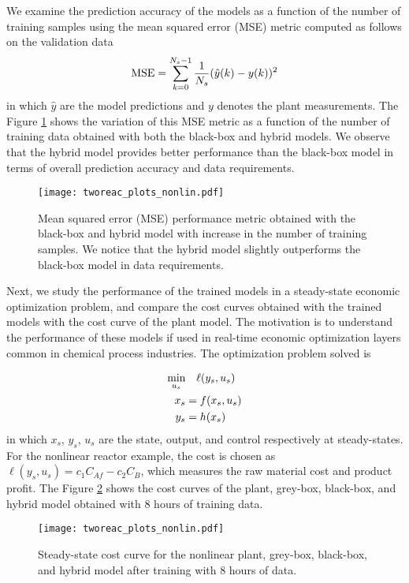 \documentclass{article}
\begin{document}
We examine the prediction accuracy of the models as a function of the number of
training samples using the mean squared error (MSE) metric computed as follows
on the validation data
\begin{align*}
  \textnormal{MSE} =  \sum_{k=0}^{N_s-1} 
  \dfrac{1}{N_s}(\hat{y}(k) - y(k))^2
\end{align*}
in which $\hat{y}$ are the model predictions and $y$ denotes the plant
measurements. The Figure \ref{fig:validation_mse} shows the variation of this
MSE metric as a function of the number of training data obtained with both the
black-box and hybrid models. We observe that the hybrid model provides better
performance than the black-box model in terms of overall prediction accuracy and
data requirements.

\begin{figure}[!h]
  \centering
  \texttt{[image: tworeac\_plots\_nonlin.pdf]}
  \caption{Mean squared error (MSE) performance metric obtained with the
           black-box and hybrid model with increase in the number of training
           samples. We notice that the hybrid model slightly outperforms the
           black-box model in data requirements.}
  \label{fig:validation_mse}
\end{figure}

Next, we study the performance of the trained models in a steady-state economic
optimization problem, and compare the cost curves obtained with the trained
models with the cost curve of the plant model. The motivation is to understand
the performance of these models if used in real-time economic optimization
layers common in chemical process industries. The optimization problem solved is

\begin{align*}
  \underset{u_s}{\textnormal{min}} & \quad \ell(y_s, u_s) \\
  x_s &= f(x_s, u_s)\\ 
  y_s &= h(x_s)
\end{align*}
in which $x_s$, $y_s$, $u_s$ are the state, output, and control respectively at
steady-states. For the nonlinear reactor example, the cost is chosen as
$\ell(y_s, u_s) = c_1C_{Af} - c_2C_B$, which measures the raw material
cost and product profit. The Figure \ref{fig:cost_curves} shows the 
cost curves of the plant, grey-box, black-box, and hybrid model 
obtained with 8 hours of training data.

\begin{figure}[!h]
  \centering
  \texttt{[image: tworeac\_plots\_nonlin.pdf]}
  \caption{Steady-state cost curve for the nonlinear plant, grey-box, black-box,
  and hybrid model after training with 8 hours of data.}
  \label{fig:cost_curves}
\end{figure}
\end{document}
